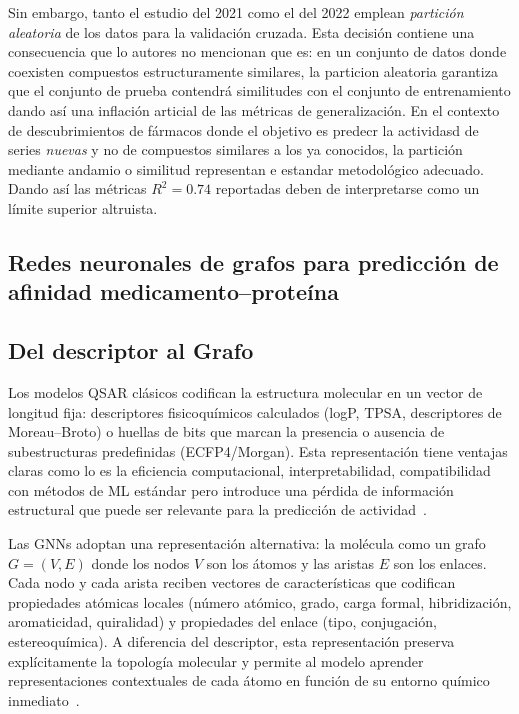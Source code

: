 Sin embargo, tanto el estudio del 2021 como el del 2022 emplean \emph{partición aleatoria} de los datos para la validación cruzada. Esta decisión contiene una consecuencia que lo autores no mencionan que es: en un conjunto de datos donde coexisten compuestos estructuramente similares, la particion aleatoria garantiza que el conjunto de prueba contendrá similitudes con el conjunto de entrenamiento dando así una inflación articial de las métricas de generalización. En el contexto de descubrimientos de fármacos donde el objetivo es predecr la actividasd de series \emph{nuevas} y no de compuestos similares a los ya conocidos, la partición mediante andamio o similitud representan e estandar metodológico adecuado. Dando así las métricas $R^2 = 0.74$ reportadas deben de interpretarse como un límite superior altruista. 

\subsection{Redes neuronales de grafos para predicción de afinidad medicamento--proteína}
\label{ssec:arte_gnn_dta}

\subsection{Del descriptor al Grafo}

Los modelos QSAR clásicos codifican la estructura molecular en un vector de longitud fija: descriptores fisicoquímicos calculados (logP, TPSA, descriptores de Moreau--Broto) o huellas de bits que marcan la presencia o ausencia de subestructuras predefinidas (ECFP4/Morgan). Esta representación tiene ventajas claras como lo es la eficiencia computacional, interpretabilidad, compatibilidad con métodos de ML estándar pero introduce una pérdida de información estructural que puede ser relevante para la predicción de actividad~\cite{jiang_could_2021}. 
 
Las GNNs adoptan una representación alternativa: la molécula como un grafo $G = (V, E)$ donde los nodos $V$ son los átomos y las aristas $E$ son los enlaces. Cada nodo y cada arista reciben vectores de características que codifican propiedades atómicas locales (número atómico, grado, carga formal, hibridización, aromaticidad, quiralidad) y propiedades del enlace (tipo, conjugación, estereoquímica). A diferencia del descriptor, esta representación preserva explícitamente la topología molecular y permite al modelo aprender representaciones contextuales de cada átomo en función de su entorno químico inmediato~\cite{jiang_could_2021}.
 
